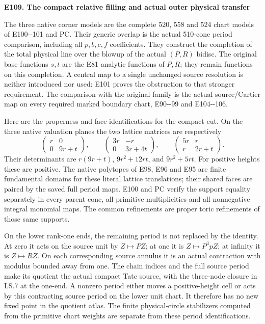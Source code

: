 \par

\medskip\noindent\textbf{E109. The compact relative filling and actual outer physical transfer}

\par\nobreak

The three native corner models are the complete 520, 558 and 524 chart models of E100-\/-101 and PC. Their generic overlap is the actual 510-cone period comparison, including all \(p,b,c,f\) coefficients. They construct the completion of the total physical line over the blowup of the actual \((P,R)\) bidisc. The original base functions \(s,t\) are the E81 analytic functions of \(P,R\); they remain functions on this completion. A central map to a single unchanged source resolution is neither introduced nor used: E101 proves the obstruction to that stronger requirement. The comparison with the original family is the actual source/Cartier map on every required marked boundary chart, E90-\/-99 and E104-\/-106.

Here are the properness and face identifications for the compact cut. On the three native valuation planes the two lattice matrices are respectively
\[
 \begin{pmatrix}r&0\\0&9r+t\end{pmatrix},\qquad
 \begin{pmatrix}3r&-r\\0&3r+4t\end{pmatrix},\qquad
 \begin{pmatrix}5r&r\\r&2r+t\end{pmatrix}.
 \tag{E109.1}
\]
Their determinants are \(r(9r+t)\), \(9r^2+12rt\), and \(9r^2+5rt\). For positive heights these are positive. The native polytopes of E98, E96 and E95 are finite fundamental domains for these literal lattice translations; their shared faces are paired by the saved full period maps. E100 and PC verify the support equality separately in every parent cone, all primitive multiplicities and all nonnegative integral monomial maps. The common refinements are proper toric refinements of those same supports.

On the lower rank-one ends, the remaining period is not replaced by the identity. At zero it acts on the source unit by \(Z\mapsto PZ\); at one it is \(Z\mapsto P^3pZ\); at infinity it is \(Z\mapsto RZ\). On each corresponding source annulus it is an actual contraction with modulus bounded away from one. The chain indices and the full source period make its quotient the actual compact Tate source, with the three-node closure in LS.7 at the one-end. A nonzero period either moves a positive-height cell or acts by this contracting source period on the lower unit chart. It therefore has no new fixed point in the quotient atlas. The finite physical-circle stabilizers computed from the primitive chart weights are separate from these period identifications.

